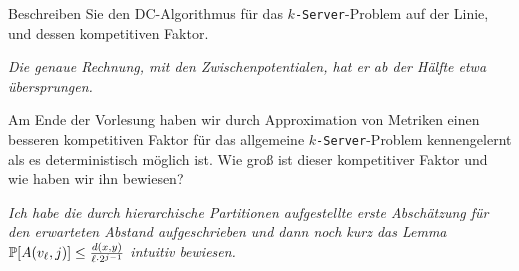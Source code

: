 \documentclass[language=ngerman]{TemplateExercise}
\begin{document}
\begin{problem}%
    Beschreiben Sie den DC-Algorithmus für das $k$\verb|-Server|-Problem auf der Linie, und dessen kompetitiven Faktor. 
    
    \emph{Die genaue Rechnung, mit den Zwischenpotentialen, hat er ab der Hälfte etwa übersprungen.}
\end{problem}

\begin{problem}%
    Am Ende der Vorlesung haben wir durch Approximation von Metriken einen besseren kompetitiven Faktor für das allgemeine $k$\verb|-Server|-Problem kennengelernt als es deterministisch möglich ist. Wie groß ist dieser kompetitiver Faktor und wie haben wir ihn bewiesen? 
    
    \emph{Ich habe die durch hierarchische Partitionen aufgestellte erste Abschätzung für den erwarteten Abstand aufgeschrieben und dann noch kurz das Lemma $\mathbb{P}[A(v_\ell, j)] \leq \frac{d(x,y)}{\ell \cdot 2^{j-1}}$ intuitiv bewiesen.}
\end{problem}
\end{document}

